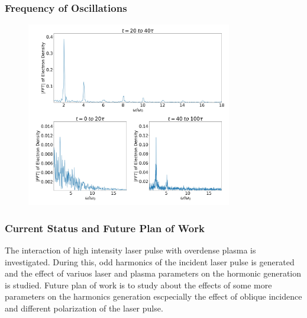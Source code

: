 \documentclass{beamer}
\begin{document}
\begin{frame}
    \frametitle{Frequency of Oscillations}
    \begin{figure}
        \centering
        \includegraphics[width=0.8\textwidth, height=0.8\textheight]{images/oscillation2.jpg}
        \label{fig:Oscillations2}
    \end{figure}
\end{frame}
\begin{frame}
    \frametitle{Current Status and Future Plan of Work}
    The interaction of high intensity laser pulse with overdense plasma is investigated. During this, odd harmonics of the incident laser pulse is generated and the effect of variuos laser and plasma parameters on the hormonic generation is studied. Future plan of work is to study about the effects of some more parameters on the harmonics generation escpecially the effect of oblique incidence and different polarization of the laser pulse.
\end{frame}

\begin{frame}
    \AtNextBibliography{\small}
    \printbibliography
\end{frame}
\end{document}

